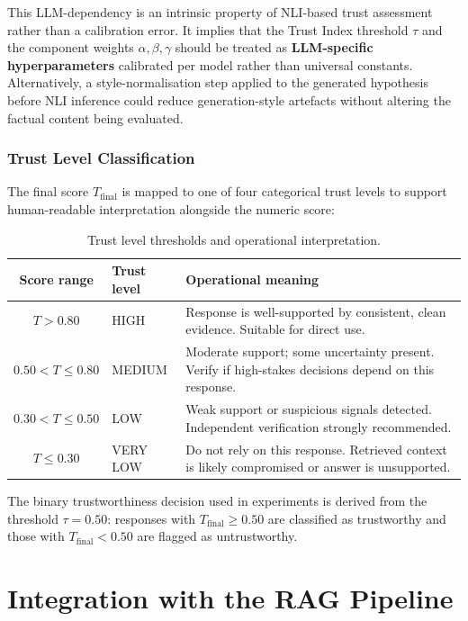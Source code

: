 This LLM-dependency is an intrinsic property of NLI-based trust assessment rather than a
calibration error. It implies that the Trust Index threshold $\tau$ and the component
weights $\alpha, \beta, \gamma$ should be treated as \textbf{LLM-specific hyperparameters}
calibrated per model rather than universal constants. Alternatively, a style-normalisation
step applied to the generated hypothesis before NLI inference could reduce generation-style
artefacts without altering the factual content being evaluated.

\subsubsection{Trust Level Classification}

The final score $T_{\text{final}}$ is mapped to one of four categorical trust levels to
support human-readable interpretation alongside the numeric score:

\begin{table}[h]
\centering
\caption{Trust level thresholds and operational interpretation.}
\label{tab:trust_levels}
\begin{tabular}{clp{7cm}}
\hline
\textbf{Score range} & \textbf{Trust level} & \textbf{Operational meaning} \\
\hline
$T > 0.80$         & HIGH      & Response is well-supported by consistent, clean evidence.
                                 Suitable for direct use. \\
$0.50 < T \leq 0.80$ & MEDIUM  & Moderate support; some uncertainty present. Verify if
                                 high-stakes decisions depend on this response. \\
$0.30 < T \leq 0.50$ & LOW     & Weak support or suspicious signals detected. Independent
                                 verification strongly recommended. \\
$T \leq 0.30$      & VERY LOW  & Do not rely on this response. Retrieved context is likely
                                 compromised or answer is unsupported. \\
\hline
\end{tabular}
\end{table}

The binary trustworthiness decision used in experiments is derived from the threshold
$\tau = 0.50$: responses with $T_{\text{final}} \geq 0.50$ are classified as trustworthy
and those with $T_{\text{final}} < 0.50$ are flagged as untrustworthy.

\section{Integration with the RAG Pipeline}

